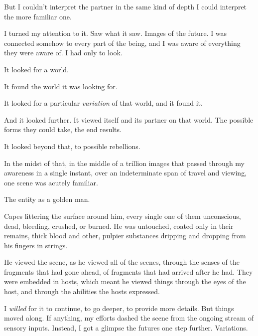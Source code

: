 But I couldn't interpret the partner in the same kind of depth I could interpret the more familiar one.



I turned my attention to it.  Saw what it saw.  Images of the future.  I was connected somehow to every part of the being, and I was aware of everything they were aware of.  I had only to look.



It looked for a world.



It found the world it was looking for.



It looked for a particular \emph{variation} of that world, and it found it.



And it looked further.  It viewed itself and its partner on that world.  The possible forms they could take, the end results.



It looked beyond that, to possible rebellions.



In the midst of that, in the middle of a trillion images that passed through my awareness in a single instant, over an indeterminate span of travel and viewing, one scene was acutely familiar.



The entity as a golden man.



Capes littering the surface around him, every single one of them unconscious, dead, bleeding, crushed, or burned.  He was untouched, coated only in their remains, thick blood and other, pulpier substances dripping and dropping from his fingers in strings.



He viewed the scene, as he viewed all of the scenes, through the senses of the fragments that had gone ahead, of fragments that had arrived after he had.  They were embedded in hosts, which meant he viewed things through the eyes of the host, and through the abilities the hosts expressed.



I \emph{willed} for it to continue, to go deeper, to provide more details.  But things moved along.  If anything, my efforts dashed the scene from the ongoing stream of sensory inputs.  Instead, I got a glimpse the futures one step further.  Variations.



